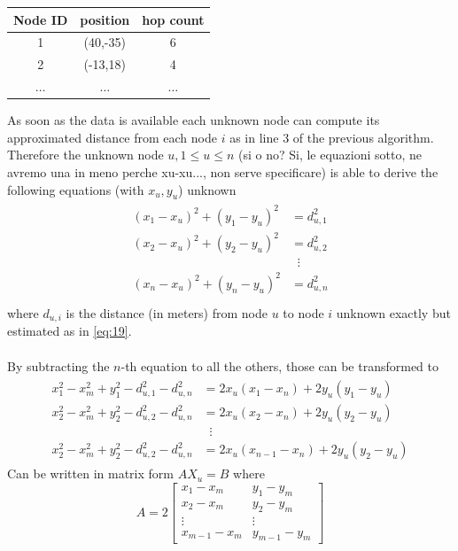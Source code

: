 \documentclass[12pt,twoside]{report}
\begin{document}
\begin{center}
\begin{tabular}{ |c|c|c| } 
 \hline
 Node ID & position & hop count \\ 
 \hline
 \hline
 1 & (40,-35) & 6 \\ 
 2 & (-13,18) & 4 \\
 $\hdots$ & $\hdots$ & $\hdots$\\
 \hline
\end{tabular}
\end{center}
As soon as the data is available each unknown node can compute its approximated distance from each node $i $ as in line $3$ of the previous algorithm. Therefore the unknown node $u, 1\leq u\leq n$ (si o no? Si, le equazioni sotto, ne avremo una in meno perche xu-xu..., non serve specificare) is able to derive the following equations (with $x_u,y_u$) unknown
\begin{align}
\begin{split} 
(x_1-x_u)^2+(y_1-y_u)^2&=d_{u,1}^2 \\ 
(x_2-x_u)^2+(y_2-y_u)^2&=d_{u,2}^2 \\ 
&\;\;\vdots\\
(x_n-x_u)^2+(y_n-y_u)^2&=d_{u,n}^2 \\
\end{split}
\end{align} 
where $d_{u,i}$ is the distance (in meters) from node $u$ to node $i$ unknown exactly but estimated as in \ref{eq:19}.
\\\\By subtracting the $n$-th equation to all the others, those can be transformed to
\begin{align}
\begin{split} 
x_1^2-x_m^2+y_1^2-d_{u,1}^2-d_{u,n}^2&=2x_u(x_1-x_n)+2y_u(y_1-y_u)\\ 
x_2^2-x_m^2+y_2^2-d_{u,2}^2-d_{u,n}^2&=2x_u(x_2-x_n)+2y_u(y_2-y_u)\\
&\;\;\vdots\\
x_2^2-x_m^2+y_2^2-d_{u,2}^2-d_{u,n}^2&=2x_u(x_{n-1}-x_n)+2y_u(y_2-y_u)
\end{split}
\end{align}
Can be written in matrix form $AX_u=B$
where 
\begin{equation}
    A=2\begin{bmatrix}
    x_1-x_m & y_1-y_m\\
    x_2-x_m & y_2-y_m\\
    \vdots & \vdots\\
    x_{m-1}-x_m & y_{m-1}-y_m
    \end{bmatrix}
\end{equation}
\end{document}
